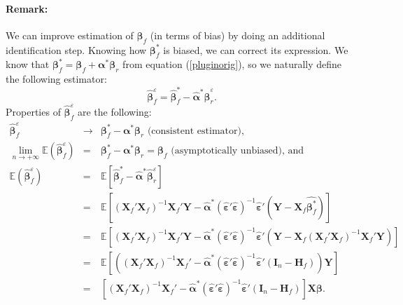 \documentclass[12pt,a4paper]{report}
\begin{document}
\paragraph{Remark:}
		We can improve estimation of $\boldsymbol{\beta}_f$ (in terms of bias) by doing an additional identification step. Knowing how $\boldsymbol{\beta}^*_f$ is biased, we can correct its expression. We know that $\boldsymbol{\beta}^*_f=\boldsymbol{\beta}_f+\boldsymbol{\alpha}^*\boldsymbol{\beta}_r $ from equation (\ref{pluginorig}), so we naturally define the following estimator:
			\begin{equation}
			\hat{\boldsymbol{\beta}}_f^{\varepsilon}=\hat{\boldsymbol{\beta}}^*_f-\hat{\boldsymbol{\alpha}}^*\hat{\boldsymbol{\beta}}_{r}^{\varepsilon}. \nonumber 
			\end{equation}
Properties of $\hat{\boldsymbol{\beta}}_f^{\varepsilon}$ are the following:
	\begin{eqnarray}
	\hat{\boldsymbol{\beta}}_f^{\varepsilon}& \longrightarrow & \boldsymbol{\beta}^*_f-\boldsymbol{\alpha}^*\boldsymbol{\beta}_{r} \textrm{ (consistent estimator),}\nonumber\\
		\lim_{n \rightarrow +\infty}\mathbb{E}(\hat{\boldsymbol{\beta}}_f^{\varepsilon})&=&\boldsymbol{\beta}_f^*-\boldsymbol{\alpha}^*\boldsymbol{\beta}_r = \boldsymbol{\beta}_f \textrm{ (asymptotically unbiased), and} \nonumber \\
		\mathbb{E}(\hat{\boldsymbol{\beta}}_f^{\varepsilon})&=&\mathbb{E}[\hat{\boldsymbol{\beta}}^*_f-\hat{\boldsymbol{\alpha}}^*\hat{\boldsymbol{\beta}}_{r}^{\varepsilon}] \nonumber \\
		&=&\mathbb{E}[(\boldsymbol{X}_f'\boldsymbol{X}_f)^{-1}\boldsymbol{X}_f'\boldsymbol{Y}-\hat{\boldsymbol{\alpha}}^*(\hat{\boldsymbol{\varepsilon}}'\hat{\boldsymbol{\varepsilon}})^{-1}\hat{\boldsymbol{\varepsilon}}'(\boldsymbol{Y}- \boldsymbol{X}_f\hat{\boldsymbol{\beta}^*_f})]  \nonumber \\
		&=&\mathbb{E}[(\boldsymbol{X}_f'\boldsymbol{X}_f)^{-1}\boldsymbol{X}_f'\boldsymbol{Y}-\hat{\boldsymbol{\alpha}}^*(\hat{\boldsymbol{\varepsilon}}'\hat{\boldsymbol{\varepsilon}})^{-1}\hat{\boldsymbol{\varepsilon}}'(\boldsymbol{Y}- \boldsymbol{X}_f(\boldsymbol{X}_f'\boldsymbol{X}_f)^{-1}\boldsymbol{X}_f'\boldsymbol{Y})]  \nonumber \\
		&=&\mathbb{E}\left[\left((\boldsymbol{X}_f'\boldsymbol{X}_f)^{-1}\boldsymbol{X}_f'-\hat{\boldsymbol{\alpha}}^*(\hat{\boldsymbol{\varepsilon}}'\hat{\boldsymbol{\varepsilon}})^{-1}\hat{\boldsymbol{\varepsilon}}'(\boldsymbol{I}_n-\boldsymbol{H}_f)\right)\boldsymbol{Y}\right]  \nonumber \\
		&=&\left[(\boldsymbol{X}_f'\boldsymbol{X}_f)^{-1}\boldsymbol{X}_f'-\hat{\boldsymbol{\alpha}}^*(\hat{\boldsymbol{\varepsilon}}'\hat{\boldsymbol{\varepsilon}})^{-1}\hat{\boldsymbol{\varepsilon}}'(\boldsymbol{I}_n-\boldsymbol{H}_f)\right]\boldsymbol{X}\boldsymbol{\beta}. \nonumber
			\end{eqnarray}
\end{document}
